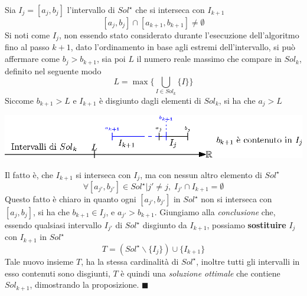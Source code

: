 \documentclass[12pt, letterpaper]{article}
\begin{document}
Sia $I_j=[a_j,b_j]$ l'intervallo di $Sol^\star$ che si interseca con $I_{k+1}$ 
$$ [a_j,b_j]\cap [a_{k+1},b_{k+1}]\ne \emptyset$$ 
Si noti come $I_j$, non essendo stato considerato durante l'esecuzione dell'algoritmo fino al passo $k+1$, dato 
l'ordinamento in base agli estremi dell'intervallo, si può affermare come $b_j>b_{k+1}$, sia poi 
$L$ il numero reale massimo che compare in $Sol_k$, definito nel seguente modo 
$$ L=\max\{\bigcup_{I\in Sol_k}\{I\}\}$$ 
Siccome $b_{k+1}>L$ e $I_{k+1}$ è disgiunto dagli elementi di $Sol_k$, si ha che $a_j>L$
\begin{center}
    \includegraphics[width=1\textwidth ]{images/dimPropIntervalli2.eps}
\end{center}
Il fatto è, che $I_{k+1}$ si interseca con $I_j$, ma con nessun altro elemento di $Sol^\star$
$$ \forall [a_{j'},b_{j'}]\in Sol^\star | j'\ne j, \; I_{j'}\cap I_{k+1}=\emptyset$$
Questo fatto è chiaro in quanto ogni $[a_{j'},b_{j'}]$ in $Sol^\star$ non si interseca con $[a_j,b_j]$, si ha che  
$b_{k+1}\in I_j$, e $a_{j'}>b_{k+1}$. Giungiamo alla \textit{conclusione} che, essendo qualsiasi intervallo $I_{j'}$ di 
$Sol^\star$ disgiunto da $I_{k+1}$, possiamo \textbf{sostituire} $I_j$ con $I_{k+1}$ in $Sol^\star$ 
$$ T=(Sol^\star \backslash \{I_j\})\cup \{I_{k+1}\}$$
Tale nuovo insieme $T$, ha la stessa cardinalità di $Sol^\star$, inoltre tutti gli intervalli in esso contenuti sono 
disgiunti, $T$ è quindi una \textit{soluzione ottimale} che contiene $Sol_{k+1}$, dimostrando la proposizione. $\blacksquare$
\end{document}

